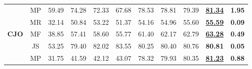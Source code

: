 \begin{table}[htbp]
\begin{tabular}{@{}c|c|cccc|cc|c|c|c@{}}
                                          & MP                                & 59.49                    & 74.28                    & 72.33                   & 67.68                   & 78.53                                                     & 78.81                                                    & 79.39                                                                                      & \underline{\textbf{81.34}}                                                                & \textbf{1.95}                     \\
                                          & MR                                & 32.14                    & 50.84                    & 53.22                   & 51.37                   & 54.16                                                     & 54.96                                                    & 55.60                                                                                      & \underline{\textbf{55.59}}                                                                & \textbf{0.09}                     \\
        \textbf{CJO}                      & MF                               & 38.85                    & 57.41                    & 58.60                   & 55.77                   & 61.40                                                     & 62.17                                                    & 62.79                                                                                      & \underline{\textbf{63.28}}                                                               & \textbf{0.49}                     \\
                                          & JS                                & 53.25                    & 79.40                    & 82.02                   & 83.55                   & 80.25                                                     & 80.40                                                    & 80.76                                                                                      & \textbf{80.81}                                                                & \textbf{0.05}                     \\
                                          & MP                                & 31.75                    & 41.59                    & 42.12                   & 43.07                   & 78.32                                                     & 79.93                                                    & 80.35                                                                                      & \underline{\textbf{81.23}}                                                                & \textbf{0.88}                     \\

\end{tabular}
\end{table}
